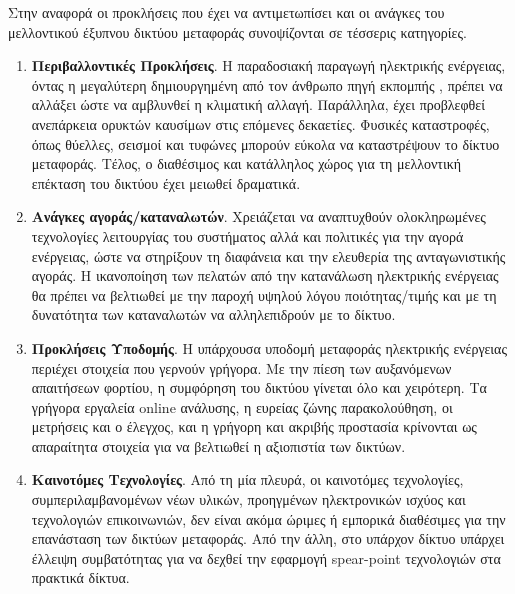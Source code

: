 \documentclass[12pt, a4paper, oneside]{report}
\begin{document}
Στην αναφορά \cite{fang} οι προκλήσεις που έχει να αντιμετωπίσει και οι ανάγκες του μελλοντικού έξυπνου δικτύου μεταφοράς συνοψίζονται σε τέσσερις κατηγορίες.
\begin{enumerate}[label=\roman*)]
\item \textbf{Περιβαλλοντικές Προκλήσεις}. Η παραδοσιακή παραγωγή ηλεκτρικής ενέργειας, όντας η μεγαλύτερη δημιουργημένη από τον άνθρωπο πηγή εκπομπής , πρέπει να αλλάξει ώστε να αμβλυνθεί η κλιματική αλλαγή. Παράλληλα, έχει προβλεφθεί ανεπάρκεια ορυκτών καυσίμων στις επόμενες δεκαετίες. Φυσικές καταστροφές, όπως θύελλες, σεισμοί και τυφώνες μπορούν εύκολα να καταστρέψουν το δίκτυο μεταφοράς. Τέλος, ο διαθέσιμος και κατάλληλος χώρος για τη μελλοντική επέκταση του δικτύου έχει μειωθεί δραματικά.
\item \textbf{Ανάγκες αγοράς\slash καταναλωτών}. Χρειάζεται να αναπτυχθούν ολοκληρωμένες τεχνολογίες λειτουργίας του συστήματος αλλά και πολιτικές για την αγορά ενέργειας, ώστε να στηρίξουν τη διαφάνεια και την ελευθερία της ανταγωνιστικής αγοράς. Η ικανοποίηση των πελατών από την κατανάλωση ηλεκτρικής ενέργειας θα πρέπει να βελτιωθεί με την παροχή υψηλού λόγου ποιότητας\slash τιμής και με τη δυνατότητα των καταναλωτών να αλληλεπιδρούν με το δίκτυο.
\item \textbf{Προκλήσεις Υποδομής}. Η υπάρχουσα υποδομή μεταφοράς ηλεκτρικής ενέργειας περιέχει στοιχεία που γερνούν γρήγορα. Με την πίεση των αυξανόμενων απαιτήσεων φορτίου, η συμφόρηση του δικτύου γίνεται όλο και χειρότερη. Τα γρήγορα εργαλεία online ανάλυσης, η ευρείας ζώνης παρακολούθηση, οι μετρήσεις και ο έλεγχος, και η γρήγορη και ακριβής προστασία κρίνονται ως απαραίτητα στοιχεία για να βελτιωθεί η αξιοπιστία των δικτύων.
\item \textbf{Καινοτόμες Τεχνολογίες}. Από τη μία πλευρά, οι καινοτόμες τεχνολογίες, συμπεριλαμβανομένων νέων υλικών, προηγμένων ηλεκτρονικών ισχύος και τεχνολογιών επικοινωνιών, δεν είναι ακόμα ώριμες ή εμπορικά διαθέσιμες για την επανάσταση των δικτύων μεταφοράς. Από την άλλη, στο υπάρχον δίκτυο υπάρχει έλλειψη συμβατότητας για να δεχθεί την εφαρμογή spear-point τεχνολογιών στα πρακτικά δίκτυα.
\end{enumerate}
\clearpage
\end{document}
